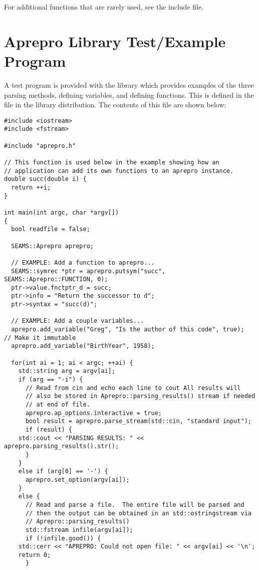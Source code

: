 For additional functions that are rarely used, see the
 include file.

\section{Aprepro Library Test/Example Program}
A test program is provided with the \aprepro{} library which provides
examples of the three parsing methods, defining variables, and
defining functions.  This is defined in the  file in
the \aprepro{} library distribution. The contents of this file are
shown below:



\begin{lstlisting}
#include <iostream>
#include <fstream>

#include "aprepro.h"

// This function is used below in the example showing how an
// application can add its own functions to an aprepro instance.
double succ(double i) {
  return ++i;
}

int main(int argc, char *argv[])
{
  bool readfile = false;

  SEAMS::Aprepro aprepro;

  // EXAMPLE: Add a function to aprepro...
  SEAMS::symrec *ptr = aprepro.putsym("succ", SEAMS::Aprepro::FUNCTION, 0);
  ptr->value.fnctptr_d = succ;
  ptr->info = "Return the successor to d";
  ptr->syntax = "succ(d)";

  // EXAMPLE: Add a couple variables...
  aprepro.add_variable("Greg", "Is the author of this code", true);  // Make it immutable
  aprepro.add_variable("BirthYear", 1958);

  for(int ai = 1; ai < argc; ++ai) {
    std::string arg = argv[ai];
    if (arg == "-i") {
      // Read from cin and echo each line to cout All results will
      // also be stored in Aprepro::parsing_results() stream if needed
      // at end of file.
      aprepro.ap_options.interactive = true;
      bool result = aprepro.parse_stream(std::cin, "standard input");
      if (result) {
	std::cout << "PARSING RESULTS: " << aprepro.parsing_results().str();
      }
    }
    else if (arg[0] == '-') {
      aprepro.set_option(argv[ai]);
    }
    else {
      // Read and parse a file.  The entire file will be parsed and
      // then the output can be obtained in an std::ostringstream via
      // Aprepro::parsing_results()
      std::fstream infile(argv[ai]);
      if (!infile.good()) {
	std::cerr << "APREPRO: Could not open file: " << argv[ai] << '\n';
	return 0;
      }


\end{lstlisting}
